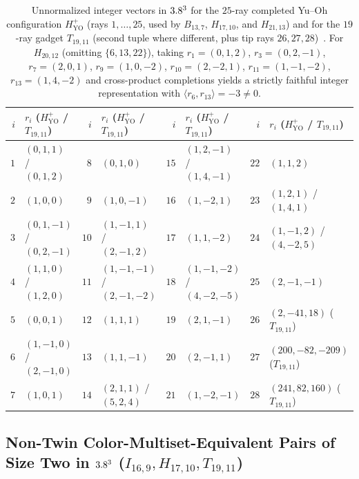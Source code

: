 \documentclass[aps,pra,reprint,superscriptaddress,longbibliography,nofootinbib,floatfix,10pt]{revtex4-2}
\theoremstyle{definition}\newtheorem{definition}[theorem]{Definition}
\theoremstyle{remark}\newtheorem{remark}[theorem]{Remark}
\newcommand{\YO}{\mathrm{YO}}\newcommand{\ip}[2]{\langle #1,#2\rangle}
\begin{document}
\begin{table}[t]
\caption{Unnormalized integer vectors in $3.8^3$ for the $25$-ray completed Yu--Oh configuration $H_{\YO}^+$ (rays $1,\ldots,25$, used by $B_{13,7}$, $H_{17,10}$, and $H_{21,13}$) and for the $19$-ray gadget $T_{19,11}$ (second tuple where different, plus tip rays $26,27,28$)~\cite{svozil-2026-chromaticcoordinatization,supplement}. For $H_{20,12}$ (omitting $\{6,13,22\}$), taking $r_1=(0,1,2)$, $r_3=(0,2,-1)$, $r_7=(2,0,1)$, $r_9=(1,0,-2)$, $r_{10}=(2,-2,1)$, $r_{11}=(1,-1,-2)$, $r_{13}=(1,4,-2)$ and cross-product completions yields a strictly faithful integer representation with $\ip{r_6}{r_{13}}=-3\neq 0$.}\label{tab:yo-vectors}
\footnotesize
\begin{ruledtabular}
\begin{tabular}{rl@{\quad}rl@{\quad}rl@{\quad}rl}
$i$ & $r_i$ ($H_{\YO}^+$ / $T_{19,11}$) & $i$ & $r_i$ ($H_{\YO}^+$ / $T_{19,11}$) & $i$ & $r_i$ ($H_{\YO}^+$ / $T_{19,11}$) & $i$ & $r_i$ ($H_{\YO}^+$ / $T_{19,11}$)\\\hline
$1$ & $(0,1,1)$ / $(0,1,2)$ & $8$ & $(0,1,0)$ & $15$ & $(1,2,-1)$ / $(1,4,-1)$ & $22$ & $(1,1,2)$\\
$2$ & $(1,0,0)$ & $9$ & $(1,0,-1)$ & $16$ & $(1,-2,1)$ & $23$ & $(1,2,1)$ / $(1,4,1)$\\
$3$ & $(0,1,-1)$ / $(0,2,-1)$ & $10$ & $(1,-1,1)$ / $(2,-1,2)$ & $17$ & $(1,1,-2)$ & $24$ & $(1,-1,2)$ / $(4,-2,5)$\\
$4$ & $(1,1,0)$ / $(1,2,0)$ & $11$ & $(1,-1,-1)$ / $(2,-1,-2)$ & $18$ & $(1,-1,-2)$ / $(4,-2,-5)$ & $25$ & $(2,-1,-1)$\\
$5$ & $(0,0,1)$ & $12$ & $(1,1,1)$ & $19$ & $(2,1,-1)$ & $26$ & $(2,-41,18)$ ($T_{19,11}$)\\
$6$ & $(1,-1,0)$ / $(2,-1,0)$ & $13$ & $(1,1,-1)$ & $20$ & $(2,-1,1)$ & $27$ & $(200,-82,-209)$ ($T_{19,11}$)\\
$7$ & $(1,0,1)$ & $14$ & $(2,1,1)$ / $(5,2,4)$ & $21$ & $(1,-2,-1)$ & $28$ & $(241,82,160)$ ($T_{19,11}$)\\
\end{tabular}
\end{ruledtabular}
\end{table}

\subsection{Non-Twin Color-Multiset-Equivalent Pairs of Size Two in \texorpdfstring{$3.8^3$}{R3} (\texorpdfstring{$I_{16,9},H_{17,10},T_{19,11}$}{I16,9, H17,10, T19,11})}\label{sec:size2-real}
\end{document}
